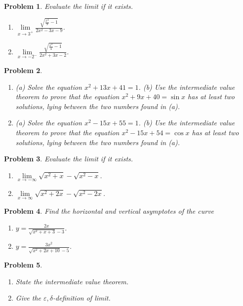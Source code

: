 \documentclass{article}
\newtheorem{problem}{Problem}
\begin{document}
\begin{problem}
Evaluate the limit if it exists.
\begin{enumerate}
\item $\lim\limits_{x\to 3^+} \frac{\sqrt{\frac{x^2}{9}-1 }}{2x^2 -3x-9 }$. 
\item $\lim\limits_{x\to -2^-} \frac{\sqrt{\frac{x^2}{4}-1 }}{2x^2 +3x-2 }$. 
\end{enumerate}
\end{problem}
\begin{problem}~
\begin{enumerate}
\item (a) Solve the equation $x^2+13x+41=1$.  (b) Use the intermediate value theorem to prove that the equation $x^2+9x+40=\sin  x$ has at least two solutions, lying between the two numbers found in (a).
\item(a) Solve the equation $x^2-15x+55=1$.  (b) Use the intermediate value theorem to prove that the equation $x^2-15x+54=\cos  x$ has at least two solutions, lying between the two numbers found in (a).
\end{enumerate}
\end{problem}
\begin{problem}
Evaluate the limit if it exists.
\begin{enumerate}
\item $\lim\limits_{x\to-\infty}\sqrt{x^2+x}-\sqrt{x^2-x}$. 
\item $\lim\limits_{x\to\infty}\sqrt{x^2+2x}-\sqrt{x^2-2x} $. 
\end{enumerate}
\end{problem}
\begin{problem}
Find the horizontal and vertical asymptotes of the curve
\begin{enumerate}
\item $y=\frac{2x}{\sqrt{x^2+x+3}-3}$. 
\item $y=\frac{3x^2}{\sqrt{x^2+2x+10}-5}$. 
\end{enumerate}
\end{problem}
\begin{problem}~
\begin{enumerate}
\item State the intermediate value theorem.
\item Give the $\varepsilon,\delta$-definition of limit.
\end{enumerate}
\end{problem}
\end{document}
